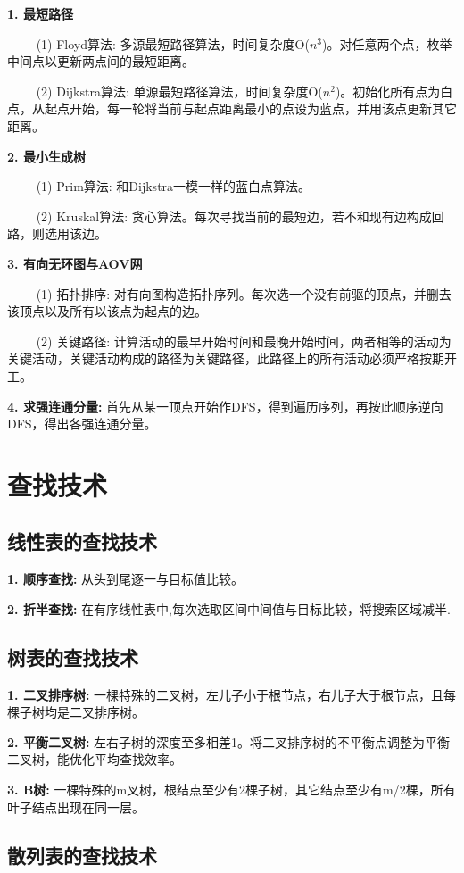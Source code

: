 \textbf{1. 最短路径}

~~~~ (1) Floyd算法: 多源最短路径算法，时间复杂度O($n^3$)。对任意两个点，枚举中间点以更新两点间的最短距离。

~~~~ (2) Dijkstra算法: 单源最短路径算法，时间复杂度O($n^2$)。初始化所有点为白点，从起点开始，每一轮将当前与起点距离最小的点设为蓝点，并用该点更新其它距离。

\textbf{2. 最小生成树}

~~~~ (1) Prim算法: 和Dijkstra一模一样的蓝白点算法。

~~~~ (2) Kruskal算法: 贪心算法。每次寻找当前的最短边，若不和现有边构成回路，则选用该边。

\textbf{3. 有向无环图与AOV网}

~~~~ (1) 拓扑排序: 对有向图构造拓扑序列。每次选一个没有前驱的顶点，并删去该顶点以及所有以该点为起点的边。

~~~~ (2) 关键路径: 计算活动的最早开始时间和最晚开始时间，两者相等的活动为关键活动，关键活动构成的路径为关键路径，此路径上的所有活动必须严格按期开工。

\textbf{4. 求强连通分量: }首先从某一顶点开始作DFS，得到遍历序列，再按此顺序逆向DFS，得出各强连通分量。

\section{查找技术}

\subsection{线性表的查找技术}

\textbf{1. 顺序查找: }从头到尾逐一与目标值比较。

\textbf{2. 折半查找: }在有序线性表中,每次选取区间中间值与目标比较，将搜索区域减半. 

\subsection{树表的查找技术}

\textbf{1. 二叉排序树: }一棵特殊的二叉树，左儿子小于根节点，右儿子大于根节点，且每棵子树均是二叉排序树。

\textbf{2. 平衡二叉树: }左右子树的深度至多相差1。将二叉排序树的不平衡点调整为平衡二叉树，能优化平均查找效率。

\textbf{3. B树: }一棵特殊的m叉树，根结点至少有2棵子树，其它结点至少有m/2棵，所有叶子结点出现在同一层。

\subsection{散列表的查找技术}

